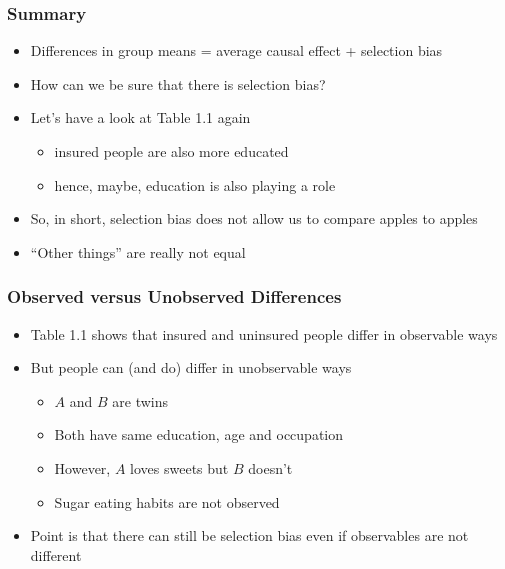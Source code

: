 \documentclass{beamer}
\begin{document}
	\begin{frame}
		\frametitle{Summary}
		\begin{itemize}
			\item Differences in group means = average causal effect + selection bias
			\item How can we be sure that there is selection bias?
			\item Let's have a look at Table 1.1 again
			\begin{itemize}
				\item insured people are also more educated
				\item hence, maybe, education is also playing a role
			\end{itemize}
			\item So, in short, selection bias does not allow us to compare apples to apples
			\item ``Other things'' are really not equal
		\end{itemize}
	\end{frame}
	
	\begin{frame}
		\frametitle{Observed versus Unobserved Differences}
		\begin{itemize}
			\item Table 1.1 shows that insured and uninsured people differ in observable ways
			\item But people can (and do) differ in unobservable ways
			\begin{itemize}
				\item $A$ and $B$ are twins
				\item Both have same education, age and occupation
				\item However, $A$ loves sweets but $B$ doesn't
				\item Sugar eating habits are not observed
			\end{itemize}
			\item Point is that there can still be selection bias even if observables are not different
		\end{itemize}
	\end{frame}




	
\end{document}
